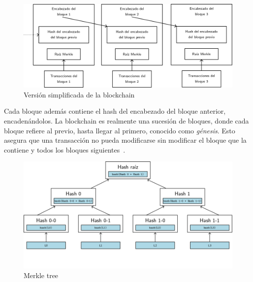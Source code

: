 \begin{figure}[h]
  \centering
  \includegraphics[scale=0.4]{figures/blockchain.png}
  \caption{Versión simplificada de la blockchain}
  \label{fig:blockchain}
\end{figure}

%
Cada bloque además contiene el hash del encabezado del bloque anterior, encadenándolos.
La blockchain es realmente una sucesión de bloques, donde cada bloque refiere al previo,
hasta llegar al primero, conocido como \textit{génesis}.
Esto asegura que una transacción no pueda modificarse sin modificar el bloque
que la contiene y todos los bloques siguientes~\cite{bitcoin}.

\begin{figure}[h]
  \centering
  \includegraphics[scale=0.4]{figures/merkle-tree.png}
  \caption{Merkle tree}
  \label{fig:merkle-tree}
\end{figure}


